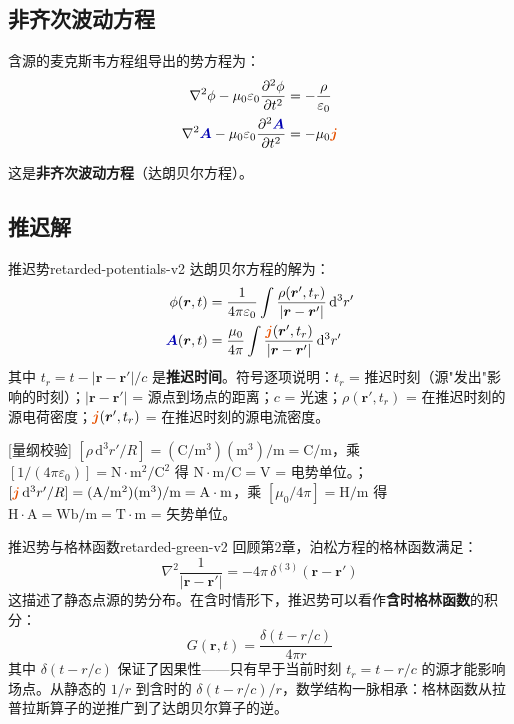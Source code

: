 \documentclass[11pt,a4paper,openany,oneside]{book}
\newcommand{\diff}{\mathrm{d}}
\newcommand{\vecJ}{\textcolor{cororange}{\vect{j}}}
\newcommand{\vecA}{\textcolor{blue!70!black}{\vect{A}}}
\newcommand{\eps}{\varepsilon}
\newcommand{\muz}{\mu_0}
\newcommand{\vect}[1]{\bm{#1}}
\newcommand{\lap}{\nabla^2}
\begin{document}
\subsection{非齐次波动方程}

含源的麦克斯韦方程组导出的势方程为：
\begin{align}
\lap\phi - \muz\eps_0\frac{\partial^2\phi}{\partial t^2} &= -\frac{\rho}{\eps_0} \\
\lap\vecA - \muz\eps_0\frac{\partial^2\vecA}{\partial t^2} &= -\muz\vecJ
\end{align}

这是\textbf{非齐次波动方程}（达朗贝尔方程）。

\subsection{推迟解}

\begin{theorem}{推迟势}{retarded-potentials-v2}
达朗贝尔方程的解为：
\begin{align}
\phi(\vect{r},t) &= \frac{1}{4\pi\eps_0} \int \frac{\rho(\vect{r}', t_r)}{|\vect{r} - \vect{r}'|} \, \diff^3r' \\
\vecA(\vect{r},t) &= \frac{\muz}{4\pi} \int \frac{\vecJ(\vect{r}', t_r)}{|\vect{r} - \vect{r}'|} \, \diff^3r'
\end{align}
其中 $t_r = t - |\vect{r} - \vect{r}'|/c$ 是\textbf{推迟时间}。符号逐项说明：$t_r$ = 推迟时刻（源"发出"影响的时刻）；$|\vect{r}-\vect{r}'|$ = 源点到场点的距离；$c$ = 光速；$\rho(\vect{r}',t_r)$ = 在推迟时刻的源电荷密度；$\vecJ(\vect{r}',t_r)$ = 在推迟时刻的源电流密度。

[量纲校验] $[\rho\,\diff^3r'/R] = (\mathrm{C/m^3})(\mathrm{m^3})/\mathrm{m} = \mathrm{C/m}$，乘 $[1/(4\pi\eps_0)] = \mathrm{N\cdot m^2/C^2}$ 得 $\mathrm{N\cdot m/C} = \mathrm{V}$ = 电势单位。\checkmark；$[\vecJ\,\diff^3r'/R] = (\mathrm{A/m^2})(\mathrm{m^3})/\mathrm{m} = \mathrm{A\cdot m}$，乘 $[\muz/4\pi] = \mathrm{H/m}$ 得 $\mathrm{H\cdot A} = \mathrm{Wb/m} = \mathrm{T\cdot m}$ = 矢势单位。\checkmark
\end{theorem}

\begin{insight}{推迟势与格林函数}{retarded-green-v2}
回顾第2章，泊松方程的格林函数满足：
\[
\lap \frac{1}{|\vect{r} - \vect{r}'|} = -4\pi \, \delta^{(3)}(\vect{r} - \vect{r}')
\]
这描述了静态点源的势分布。在含时情形下，推迟势可以看作\textbf{含时格林函数}的积分：
\[
G(\vect{r}, t) = \frac{\delta(t - r/c)}{4\pi r}
\]
其中 $\delta(t - r/c)$ 保证了因果性——只有早于当前时刻 $t_r = t - r/c$ 的源才能影响场点。从静态的 $1/r$ 到含时的 $\delta(t-r/c)/r$，数学结构一脉相承：格林函数从拉普拉斯算子的逆推广到了达朗贝尔算子的逆。
\end{insight}
\end{document}
